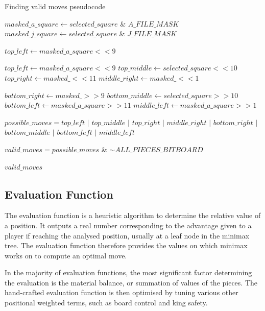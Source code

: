 \documentclass[../main/main.tex]{subfiles}
\begin{document}
\begin{algorithm}[H]
\caption{Finding valid moves pseudocode}
\label{alg:valid-moves}
\begin{algorithmic}
    \State $masked\_a\_square \gets selected\_square$ \&  $A\_FILE\_MASK$
    \State $masked\_j\_square \gets selected\_square$ \& $J\_FILE\_MASK$

    \bigskip

    \State $top\_left \gets masked\_a\_square << 9$
	
	\State $top\_left \gets masked\_a\_square << 9$
	\State $top\_middle \gets selected\_square << 10$
	\State $top\_right \gets masked\_ << 11$
	\State $middle\_right \gets masked\_ << 1$

	\State $bottom\_right \gets masked\_ >> 9$
	\State $bottom\_middle \gets selected\_square >> 10$
	\State $bottom\_left \gets masked\_a\_square >> 11$
	\State $middle\_left \gets masked\_a\_square >> 1$

    \bigskip

    \State $possible\_moves = top\_left$ $\vert$ $top\_middle$ $\vert$ $top\_right$ $\vert$ $middle\_right$ $\vert$ $bottom\_right$ $\vert$ $bottom\_middle$ $\vert$ $bottom\_left$ $\vert$ $middle\_left$

    \State $valid\_moves = possible\_moves$ \& $\sim ALL\_PIECES\_BITBOARD$

    \bigskip

    \State \Return $valid\_moves$
    \EndFunction
\end{algorithmic}
\end{algorithm}

\subsection{Evaluation Function}
The evaluation function is a heuristic algorithm to determine the relative value of a position. It outputs a real number corresponding to the advantage given to a player if reaching the analysed position, usually at a leaf node in the minimax tree. The evaluation function therefore provides the values on which minimax works on to compute an optimal move.

In the majority of evaluation functions, the most significant factor determining the evaluation is the material balance, or summation of values of the pieces. The hand-crafted evaluation function is then optimised by tuning various other positional weighted terms, such as board control and king safety. 
\end{document}
